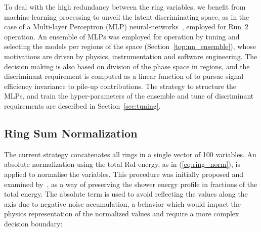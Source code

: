 To deal with the high redundancy between the ring variables, we benefit from machine learning processing to unveil the latent discriminating space, as in
the case of a Multi-layer Perceptron (MLP) neural-networks~\cite{haykin_2008},
employed for Run~2 operation. 
An ensemble of MLPs was employed for operation by tuning and selecting
the models per regions of the \eteta space (Section~\ref{top:nn_ensemble}), whose
motivations are driven by physics, instrumentation and software 
engineering. The \rnn
decision making is also based on division of the phase space in regions, and the discriminant requirement is
computed as a linear function of \avgmu to pursue signal efficiency invariance
to pile-up contributions. 
The strategy to structure the MLPs,  and train the hyper-parameters of the ensemble and tune of discriminant requirements 
are described in Section~\ref{sec:tuning}.


%

\subsection{Ring Sum Normalization}\label{top:pp}

The current strategy concatenates all rings in a single vector of 100
variables. An absolute normalization using the total RoI energy, as in
(\ref{eq:ring_norm}), is applied to normalise the variables. This procedure was
initially proposed and examined by~\cite{1995_seixas_ringer}, as a way of
preserving the shower energy profile in fractions of the total energy. The
absolute term is used to avoid reflecting the values along the axis due to
negative noise accumulation, a behavior which would impact the physics
representation of the normalized values and require a more complex decision
boundary:


